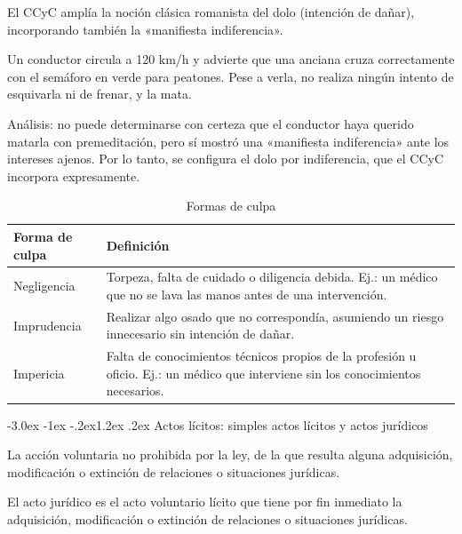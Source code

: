 \documentclass[12pt,oneside]{book}
\makeatletter
\renewcommand\section{\@startsection{section}{1}{\z@}%
  {-3.0ex \@plus -1ex \@minus -.2ex}{1.2ex \@plus .2ex}%
  {\normalfont\large\bfseries\color{acento}}}
\makeatother
\begin{document}
El CCyC amplía la noción clásica romanista del dolo (intención de dañar), incorporando también la «manifiesta indiferencia».

\begin{ejemplo}
Un conductor circula a 120 km/h y advierte que una anciana cruza correctamente con el semáforo en verde para peatones. Pese a verla, no realiza ningún intento de esquivarla ni de frenar, y la mata.

Análisis: no puede determinarse con certeza que el conductor haya querido matarla con premeditación, pero sí mostró una «manifiesta indiferencia» ante los intereses ajenos. Por lo tanto, se configura el dolo por indiferencia, que el CCyC incorpora expresamente.
\end{ejemplo}

\begin{table}[H]
\centering
\caption{Formas de culpa}
\begin{tabularx}{\textwidth}{l X}
\toprule
\textbf{Forma de culpa} & \textbf{Definición} \\
\midrule
Negligencia & Torpeza, falta de cuidado o diligencia debida. Ej.: un médico que no se lava las manos antes de una intervención. \\
Imprudencia & Realizar algo osado que no correspondía, asumiendo un riesgo innecesario sin intención de dañar. \\
Impericia & Falta de conocimientos técnicos propios de la profesión u oficio. Ej.: un médico que interviene sin los conocimientos necesarios. \\
\bottomrule
\end{tabularx}
\end{table}

\section{Actos lícitos: simples actos lícitos y actos jurídicos}

\begin{definicion}
La acción voluntaria no prohibida por la ley, de la que resulta alguna adquisición, modificación o extinción de relaciones o situaciones jurídicas.
\end{definicion}

\begin{definicion}
El acto jurídico es el acto voluntario lícito que tiene por fin inmediato la adquisición, modificación o extinción de relaciones o situaciones jurídicas.
\end{definicion}
\end{document}
